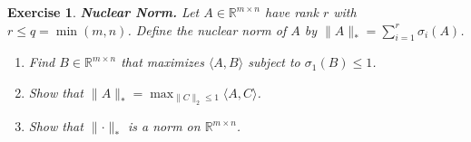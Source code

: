 \documentclass[12pt]{article}
\theoremstyle{colon}
\newtheorem{exercise}{Exercise}
\begin{document}
\clearpage

\begin{exercise}
  \textbf{Nuclear Norm.} Let $A \in \mathbb{R}^{m \times n}$ have rank $r$ with $r \leq q = \min (m,n)$. Define the nuclear norm of $A$ by $\lVert A \rVert_* = \sum_{i=1}^r \sigma_i(A)$.

  \begin{enumerate}[label=\alph*)]
    \item Find $B \in \mathbb{R}^{m \times n}$ that maximizes $\langle A, B \rangle$ subject to $\sigma_1(B) \leq 1$.
    \item Show that $\lVert A \rVert_* = \max_{\lVert C \rVert_2 \leq 1} \langle A, C \rangle$.
    \item Show that $\lVert \cdot \rVert_*$ is a norm on $\mathbb{R}^{m \times n}$.
  \end{enumerate}
\end{exercise}
\end{document}
